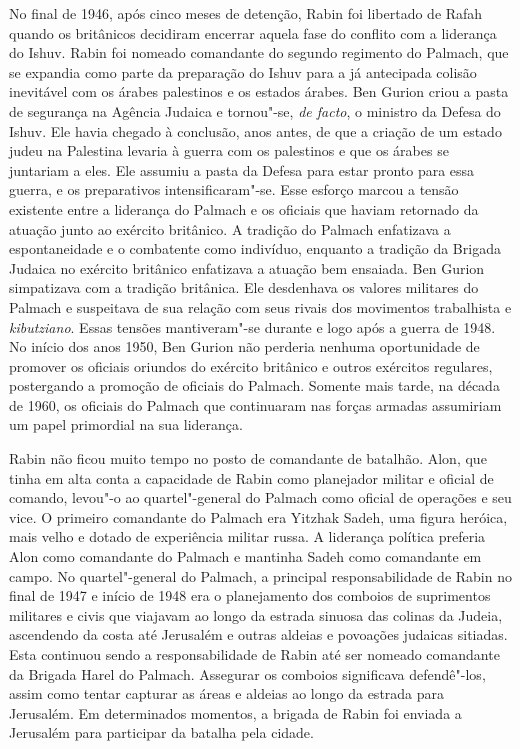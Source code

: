 No final de 1946, após cinco meses de detenção, Rabin foi libertado de
Rafah quando os britânicos decidiram encerrar aquela fase do conflito
com a liderança do Ishuv. Rabin foi nomeado comandante do segundo
regimento do Palmach, que se expandia como parte da preparação do Ishuv
para a já antecipada colisão inevitável com os árabes palestinos e os
estados árabes. Ben Gurion criou a pasta de segurança na Agência Judaica
e tornou"-se, \emph{de facto}, o ministro da Defesa do Ishuv. Ele havia
chegado à conclusão, anos antes, de que a criação de um estado judeu na
Palestina levaria à guerra com os palestinos e que os árabes se
juntariam a eles. Ele assumiu a pasta da Defesa para estar pronto para
essa guerra, e os preparativos intensificaram"-se. Esse esforço marcou a
tensão existente entre a liderança do Palmach e os oficiais que haviam
retornado da atuação junto ao exército britânico. A tradição do Palmach
enfatizava a espontaneidade e o combatente como indivíduo, enquanto a
tradição da Brigada Judaica no exército britânico enfatizava a atuação
bem ensaiada. Ben Gurion simpatizava com a tradição britânica. Ele
desdenhava os valores militares do Palmach e suspeitava de sua relação
com seus rivais dos movimentos trabalhista e \emph{kibutziano}. Essas tensões
mantiveram"-se durante e logo após a guerra de 1948. No início dos anos
1950, Ben Gurion não perderia nenhuma oportunidade de promover os
oficiais oriundos do exército britânico e outros exércitos regulares,
postergando a promoção de oficiais do Palmach. Somente mais tarde, na
década de 1960, os oficiais do Palmach que continuaram nas forças
armadas assumiriam um papel primordial na sua liderança.

Rabin não ficou muito tempo no posto de comandante de batalhão. Alon,
que tinha em alta conta a capacidade de Rabin como planejador militar e
oficial de comando, levou"-o ao quartel"-general do Palmach como oficial
de operações e seu vice. O primeiro comandante do Palmach era Yitzhak
Sadeh, uma figura heróica, mais velho e dotado de experiência militar
russa. A liderança política preferia Alon como comandante do Palmach e
mantinha Sadeh como comandante em campo. No quartel"-general do Palmach,
a principal responsabilidade de Rabin no final de 1947 e início de 1948
era o planejamento dos comboios de suprimentos militares e civis que
viajavam ao longo da estrada sinuosa das colinas da Judeia, ascendendo
da costa até Jerusalém e outras aldeias e povoações judaicas sitiadas.
Esta continuou sendo a responsabilidade de Rabin até ser nomeado
comandante da Brigada Harel do Palmach. Assegurar os comboios
significava defendê"-los, assim como tentar capturar as áreas e aldeias
ao longo da estrada para Jerusalém. Em determinados momentos, a brigada
de Rabin foi enviada a Jerusalém para participar da batalha pela cidade.

